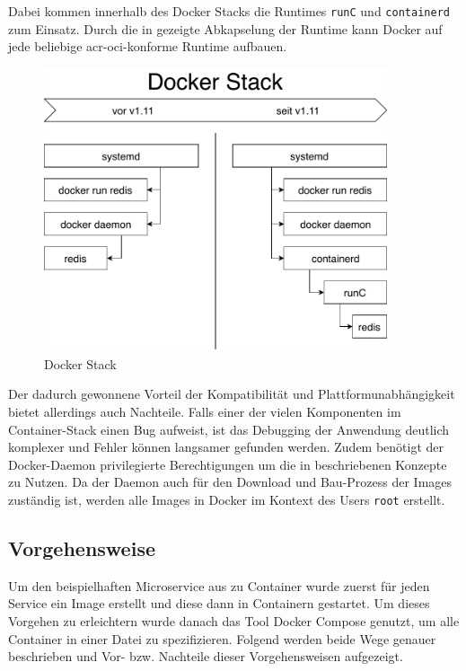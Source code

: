 Dabei kommen innerhalb des Docker Stacks die Runtimes \texttt{runC} und \texttt{containerd} zum Einsatz. Durch die in  gezeigte Abkapselung der Runtime kann Docker auf jede beliebige \gls{acr-oci}-konforme Runtime aufbauen.

\begin{figure}[h]
	\begin{center}
		\includegraphics[width=0.9\textwidth]{bilder/docker-stack-containerd-runC.pdf}
		\caption{Docker Stack \citep{RktVsOtherProjects}}
		\label{fig:dockerStack}		
	\end{center}
\end{figure}

Der dadurch gewonnene Vorteil der Kompatibilität und Plattformunabhängigkeit bietet allerdings auch Nachteile. Falls einer der vielen Komponenten im Container-Stack einen Bug aufweist, ist das Debugging der Anwendung deutlich komplexer und Fehler können langsamer gefunden werden. Zudem benötigt der Docker-Daemon privilegierte Berechtigungen um die in  beschriebenen Konzepte zu Nutzen. Da der Daemon auch für den Download und Bau-Prozess der Images zuständig ist, werden alle Images in Docker im Kontext des Users \texttt{root} erstellt.

\subsection{Vorgehensweise}
\label{sec:compDockerVorgehen}

Um den beispielhaften Microservice aus  zu Container wurde zuerst für jeden Service ein Image erstellt und diese dann in Containern gestartet. Um dieses Vorgehen zu erleichtern wurde danach das Tool Docker Compose genutzt, um alle Container in einer Datei zu spezifizieren. Folgend werden beide Wege genauer beschrieben und Vor- bzw. Nachteile dieser Vorgehensweisen aufgezeigt.

